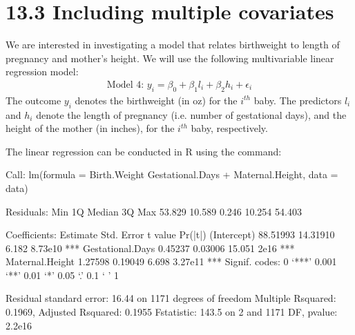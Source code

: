 \documentclass[letterpaper,10pt,english]{jupyterBook}
\begin{document}
\section{13.3 Including multiple covariates}
\label{\detokenize{13.d. Linear Regression II:including-multiple-covariates}}\label{\detokenize{13.d. Linear Regression II::doc}}
\sphinxAtStartPar
We are interested in investigating a model that relates birthweight to length of pregnancy and mother’s height. We will use the following multivariable linear regression model:
\begin{equation*}
\begin{split}
\text{Model 4: } y_i = \beta_0 + \beta_1 l_i + \beta_2h_i  + \epsilon_i 
\end{split}
\end{equation*}
\sphinxAtStartPar
The outcome \(y_i\) denotes the birthweight (in oz) for the \(i^{th}\) baby. The predictors \(l_i\) and \(h_i\) denote the length of pregnancy (i.e. number of gestational days), and the height of the mother (in inches), for the \(i^{th}\) baby, respectively.

\sphinxAtStartPar
The linear regression can be conducted in R using the  command:

\begin{sphinxVerbatim}[commandchars=\\\{\}]
 
 
\end{sphinxVerbatim}

\begin{sphinxVerbatim}[commandchars=\\\{\}]
Call:
lm(formula = Birth.Weight \PYGZti{} Gestational.Days + Maternal.Height, 
    data = data)

Residuals:
    Min      1Q  Median      3Q     Max 
\PYGZhy{}53.829 \PYGZhy{}10.589   0.246  10.254  54.403 

Coefficients:
                  Estimate Std. Error t value Pr(\PYGZgt{}|t|)    
(Intercept)      \PYGZhy{}88.51993   14.31910  \PYGZhy{}6.182 8.73e\PYGZhy{}10 ***
Gestational.Days   0.45237    0.03006  15.051  \PYGZlt{} 2e\PYGZhy{}16 ***
Maternal.Height    1.27598    0.19049   6.698 3.27e\PYGZhy{}11 ***
\PYGZhy{}\PYGZhy{}\PYGZhy{}
Signif. codes:  0 ‘***’ 0.001 ‘**’ 0.01 ‘*’ 0.05 ‘.’ 0.1 ‘ ’ 1

Residual standard error: 16.44 on 1171 degrees of freedom
Multiple R\PYGZhy{}squared:  0.1969,	Adjusted R\PYGZhy{}squared:  0.1955 
F\PYGZhy{}statistic: 143.5 on 2 and 1171 DF,  p\PYGZhy{}value: \PYGZlt{} 2.2e\PYGZhy{}16
\end{sphinxVerbatim}
\end{document}
